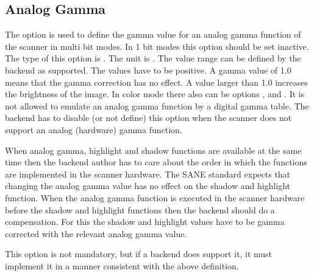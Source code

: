 \documentclass[11pt,DVIps]{report}
\begin{document}
\begin{changebar}
\subsection{Analog Gamma}
The option  is used to define the gamma value 
for an analog gamma function of the scanner in multi bit modes.
In 1 bit modes this option should be set inactive.
The type of this option is .
The unit is . The value range
can be defined by the backend as supported. The values
have to be positive. A gamma value of 1.0 means that
the gamma correction has no effect. A value larger than
1.0 increases the brightness of the image.
In color mode there also can be options ,
 and .
It is not allowed to emulate an analog gamma function by
a digital gamma table. The backend has to disable (or not
define) this option when the scanner does not support an
analog (hardware) gamma function.

When analog gamma, highlight and shadow functions are available
at the same time then the backend author has to care about the order
in which the functions are implemented in the scanner hardware.
The SANE standard expects that changing the analog gamma value
has no effect on the shadow and highlight function. When the
analog gamma function is executed in the scanner hardware
before the shadow and highlight functions then the backend
should do a compensation. For this the shadow and highlight
values have to be gamma corrected with the relevant analog gamma value.

This option is not mandatory, but if a backend does support it, it
must implement it in a manner consistent with the above definition.
\end{changebar}
\end{document}
